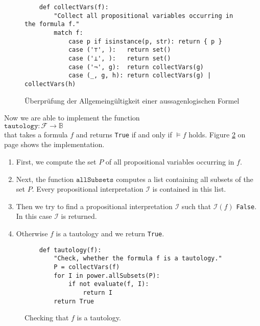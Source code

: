 \begin{figure}[!ht]
  \centering
\begin{verbatim}
    def collectVars(f):
        "Collect all propositional variables occurring in the formula f."
        match f:
            case p if isinstance(p, str): return { p }
            case ('⊤', ):   return set()
            case ('⊥', ):   return set()
            case ('¬', g):  return collectVars(g)
            case (_, g, h): return collectVars(g) | collectVars(h) 
\end{verbatim}
\vspace*{-0.3cm}
  \caption{Überprüfung der Allgemeingültigkeit einer aussagenlogischen Formel}
  \label{fig:tautology.py-collectVars}
\end{figure}

Now we are able to implement the function 
\\[0.2cm]
\hspace*{1.3cm}
$\mathtt{tautology}: \mathcal{F} \rightarrow \mathbb{B}$
\\[0.2cm]
that takes a formula $f$ and returns \texttt{True} if and only if $\models f$ holds.
Figure \ref{fig:tautology.py} on page \pageref{fig:tautology.py}
shows the implementation.
\begin{enumerate}
\item First, we compute the set $P$ of all propositional variables occurring in $f$.
\item Next, the function $\mathtt{allSubsets}$ computes a list containing all subsets of the set $P$.
      Every propositional interpretation  $\mathcal{I}$ is contained in this list.
\item Then we try to find a propositional interpretation $\mathcal{I}$ such that $\mathcal{I}(f)$
      \texttt{False}.  In this case $\mathcal{I}$ is returned. 
\item Otherwise $f$ is a tautology and we return \texttt{True}.
\end{enumerate}

\begin{figure}[!ht]
  \centering
\begin{verbatim}
    def tautology(f):
        "Check, whether the formula f is a tautology."
        P = collectVars(f)
        for I in power.allSubsets(P):
            if not evaluate(f, I):
                return I
        return True
\end{verbatim}
\vspace*{-0.3cm}
  \caption{Checking that $f$ is a tautology.}
  \label{fig:tautology.py}
\end{figure}



